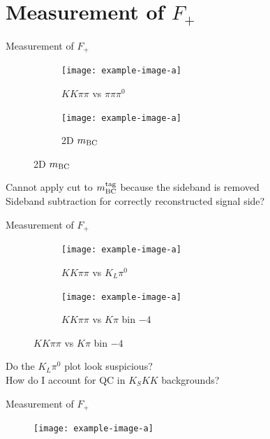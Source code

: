 \documentclass{beamer}
\begin{document}
\section{Measurement of \texorpdfstring{$F_+$}{F+}}
\begin{frame}{Measurement of $F_+$}
  \begin{figure}
    \centering
    \begin{subfigure}{0.38\textwidth}
      \centering
      \texttt{[image: example-image-a]}
      \caption{$KK\pi\pi$ vs $\pi\pi\pi^0$}
    \end{subfigure}%
    \begin{subfigure}{0.38\textwidth}
      \centering
      \texttt{[image: example-image-a]}
      \caption{2D $m_{\rm BC}$}
    \end{subfigure}
  \end{figure}
  \begin{center}
    Cannot apply cut to $m_{\rm BC}^{\rm tag}$ because the sideband is removed \\
    Sideband subtraction for correctly reconstructed signal side?
  \end{center}
\end{frame}

\begin{frame}{Measurement of $F_+$}
  \begin{figure}
    \centering
    \begin{subfigure}{0.38\textwidth}
      \centering
      \texttt{[image: example-image-a]}
      \caption{$KK\pi\pi$ vs $K_L\pi^0$}
    \end{subfigure}%
    \begin{subfigure}{0.38\textwidth}
      \centering
      \texttt{[image: example-image-a]}
      \caption{$KK\pi\pi$ vs $K\pi$ bin $-4$}
    \end{subfigure}
  \end{figure}
  \begin{center}
    Do the $K_L\pi^0$ plot look suspicious? \\
    How do I account for QC in $K_SKK$ backgrounds?
  \end{center}
\end{frame}

\begin{frame}{Measurement of $F_+$}
  \begin{figure}
    \centering
    \texttt{[image: example-image-a]}
  \end{figure}
\end{frame}
\end{document}
